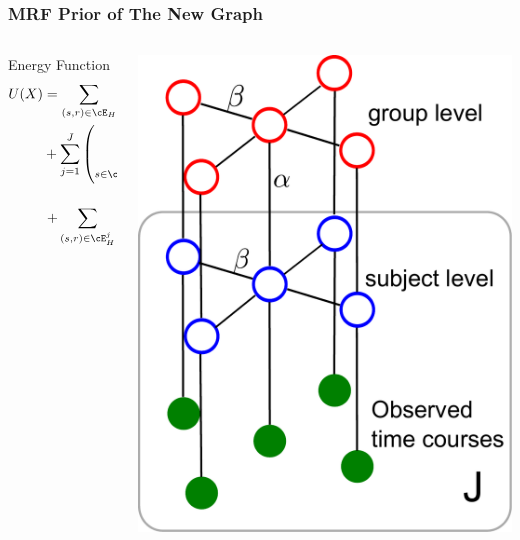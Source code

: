 \documentclass[serif]{beamer}
\begin{document}
\begin{frame}
  \frametitle{MRF Prior of The New Graph}
  \begin{columns}
    \begin{column}{8cm}  

      \begin{block}{Energy Function}
        \begin{align*}
          U(X) &= \sum_{(s,r)\in\cE_H} \beta \psi(x_s, x_r) \\
          &+ \sum_{j=1}^J \left ( \sum_{s\in\cV_G, \tilde s\in\cV_H^j} \alpha \psi(x_s, x_{\tilde s}) \right.\\
          &\left.+ \sum_{(s,r)\in\cE_H^j}\beta\psi(x_s, x_r) \right ).
        \end{align*}
      \end{block}

    \end{column}

    \begin{column}{3cm}
      \includegraphics[width=\textwidth]{figure1/grp2}
    \end{column}
  \end{columns}
\end{frame}
\end{document}
